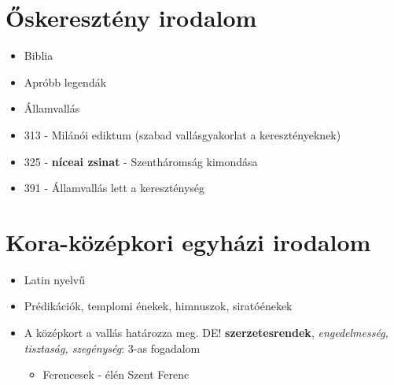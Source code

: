 \documentclass{article}
\begin{document}
\section{Őskeresztény irodalom}
\begin{itemize}
    \item Biblia
    \item Apróbb legendák
    \item Államvallás
    \item 313 - Milánói ediktum (szabad vallásgyakorlat a keresztényeknek)
    \item 325 - \textbf{níceai zsinat} - Szentháromság kimondása
    \item 391 - Államvallás lett a kereszténység
\end{itemize}

\section{Kora-középkori egyházi irodalom}
\begin{itemize}
    \item Latin nyelvű
    \item Prédikációk, templomi énekek, himnuszok, siratóénekek
    
    \item A középkort a vallás határozza meg. DE! \textbf{szerzetesrendek}, \emph{engedelmesség, tisztaság, szegénység}: 3-as fogadalom 
    \begin{itemize}
        \item Ferencesek - élén Szent Ferenc
    \end{itemize}
\end{itemize}
\end{document}
